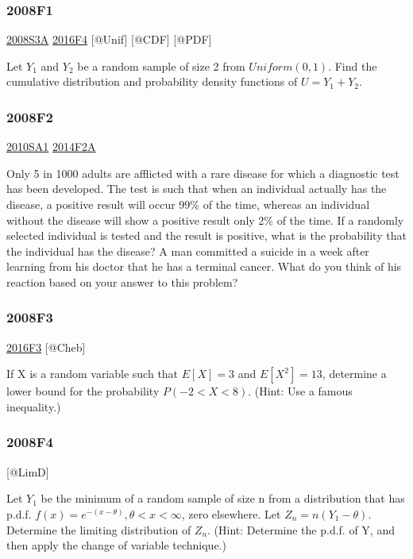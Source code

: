\documentclass[6pt,Portrait]{article}
\begin{document}
\hypertarget{f1-3}{%
\subsubsection{2008F1}\label{f1-3}}

\protect\hyperlink{s3a}{2008S3A} \protect\hyperlink{f4-6}{2016F4}
{[}@Unif{]} {[}@CDF{]} {[}@PDF{]}

Let \(Y_1\) and \(Y_2\) be a random sample of size 2 from
\(Uniform(0,1)\). Find the cumulative distribution and probability
density functions of \(U=Y_1+Y_2\).

\hypertarget{f2-3}{%
\subsubsection{2008F2}\label{f2-3}}

\protect\hyperlink{sa1-1}{2010SA1} \protect\hyperlink{f2a-1}{2014F2A}

Only 5 in 1000 adults are afflicted with a rare disease for which a
diagnostic test has been developed. The test is such that when an
individual actually has the disease, a positive result will occur 99\%
of the time, whereas an individual without the disease will show a
positive result only 2\% of the time. If a randomly selected individual
is tested and the result is positive, what is the probability that the
individual has the disease? A man committed a suicide in a week after
learning from his doctor that he has a terminal cancer. What do you
think of his reaction based on your answer to this problem?

\hypertarget{f3-3}{%
\subsubsection{2008F3}\label{f3-3}}

\protect\hyperlink{f3-6}{2016F3} {[}@Cheb{]}

If X is a random variable such that \(E[X]=3\) and \(E[X^2]=13\),
determine a lower bound for the probability \(P(-2<X<8)\). (Hint: Use a
famous inequality.)

\hypertarget{f4-3}{%
\subsubsection{2008F4}\label{f4-3}}

{[}@LimD{]}

Let \(Y_1\) be the minimum of a random sample of size n from a
distribution that has p.d.f. \(f(x)=e^{-(x-\theta)},\theta<x<\infty\),
zero elsewhere. Let \(Z_n= n(Y_1-\theta)\). Determine the limiting
distribution of \(Z_n\). (Hint: Determine the p.d.f. of Y, and then
apply the change of variable technique.)
\end{document}
